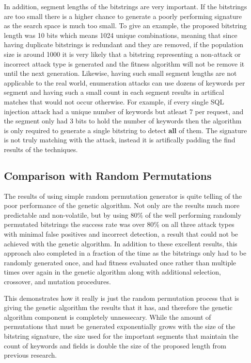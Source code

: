 In addition, segment lengths of the bitstrings are very important.  If the bitstrings are too small there is a higher chance to generate a poorly performing signature as the search space is much too small.  To give an example, the proposed bitstring length was 10 bits which means 1024 unique combinations, meaning that since having duplicate bitstrings is redundant and they are removed, if the population size is around 1000 it is very likely that a bitstring representing a non-attack or incorrect attack type is generated and the fitness algorithm will not be remove it until the next generation.  Likewise, having such small segment lengths are not applicable to the real world, enumeration attacks can use dozens of keywords per segment and having such a small count in each segment results in artifical matches that would not occur otherwise.  For example, if every single SQL injection attack had a unique number of keywords but atleast 7 per request, and the segment only had 3 bits to hold the number of keywords then the algorithm is only required to generate a single bitstring to detect \textbf{all} of them.  The signature is not truly matching with the attack, instead it is artifically padding the find results of the techniques.

\subsection{Comparison with Random Permutations}\label{sec:randDiscussion}

The results of using simple random permutation generator is quite telling of the poor performance of the genetic algorithm.  Not only are the results much more predictable and non-volatile, but by using 80\% of the well performing randomly permutated bitstrings the success rate was over 80\% on all three attack types with minimal false positives and incorrect detection, a result that could not be achieved with the genetic algorithm.  In addition to these excellent results, this approach also completed in a fraction of the time as the bitstrings only had to be randomly generated once, and had fitness evaluated once rather than multiple times over again in the genetic algorithm along with additional selection, crossover, and mutation procedures.

This demonstrates how it really is just the random permutation process that is giving the genetic algorithm the results that it has, and therefore the genetic algorithm component is completely unnessecary.  While the amount of permutations that must be generated exponentially grows with the size of the bitstring signature, the size used for the important segments that maintain the count of keywords and fields is double the size of the proposed length from previous research.

